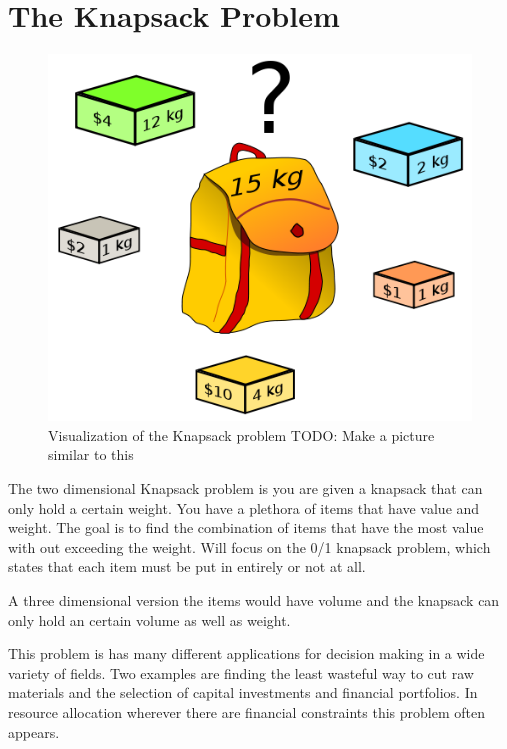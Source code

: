 \label{Ch:Knapsack}


\section*{The Knapsack Problem}

\begin{figure}[H]
\includegraphics[scale = .3]{Knapsack.png}
\caption{Visualization of the Knapsack problem TODO: Make a picture similar to this}
\end{figure}

The two dimensional Knapsack problem is you are given a knapsack that can only hold a certain weight.
You have a plethora of items that have value and weight.
The goal is to find the combination of items that have the most value with out exceeding the weight.
Will focus on the 0/1 knapsack problem, which states that each item must be put in entirely or not at all.

A three dimensional version the items would have volume and the knapsack can only hold an certain volume as well as weight. 

This problem is has many different applications for decision making in a wide variety of fields.
Two examples are finding the least wasteful way to cut raw materials and the selection of capital investments and financial portfolios.
In resource allocation wherever there are financial constraints this problem often appears. 
  

